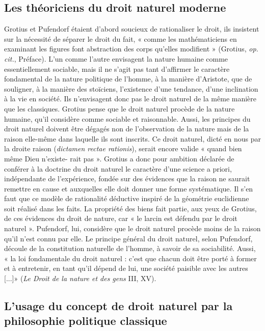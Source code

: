 \subsection{Les théoriciens du droit naturel moderne}

Grotius et Pufendorf étaient d’abord
soucieux de rationaliser le droit, ils insistent sur la nécessité de séparer le droit
du fait, « comme les mathématiciens en
examinant les figures font abstraction
des corps qu'elles modifient » (Grotius,
{\it op. cit.}, Préface). L'un comme l’autre
envisagent la nature humaine comme
essentiellement sociable, mais il ne s’agit
pas tant d’affirmer le caractère fondamental de la nature politique de l’homme, à la
manière d’Aristote, que de souligner, à la
manière des stoïciens, l’existence d’une
tendance, d’une inclination à la vie en
société. Ils n’envisagent donc pas le droit
naturel de la même manière que les classiques. Grotius pense que le droit naturel
procède de la nature humaine, qu'il considère comme sociable et raisonnable.
Aussi, les principes du droit naturel doivent être dégagés non de l’observation de
la nature mais de la raison elle-même
dans laquelle ils sont inscrits. Ce droit
naturel, dicté en nous par la droite raison
({\it dictamen rectae rationis}), serait encore
valide « quand bien même Dieu n’existe-
rait pas ». Grotius a donc pour ambition
déclarée de conférer à la doctrine du droit
naturel le caractère d’une science a priori,
indépendante de l’expérience, fondée sur
des évidences que la raison ne saurait
remettre en cause et auxquelles elle doit
donner une forme systématique. Il s’en
faut que ce modèle de rationalité déductive inspiré de la géométrie euclidienne
soit réalisé dans les faits. La propriété des
biens fait partie, aux yeux de Grotius, de
ces évidences du droit de nature, car « le
larcin est défendu par le droit naturel ».
Pufendorf, lui, considère que le droit
naturel procède moins de la raison qu'il
n'est connu par elle. Le principe général
du droit naturel, selon Pufendorf, découle
de la constitution naturelle de l’homme,
à savoir de sa sociabilité. Aussi, « la loi
fondamentale du droit naturel : c’est que
chacun doit être porté à former et à entretenir, en tant qu'il dépend de lui, une
société paisible avec les autres [...]» ({\it Le
Droit de la nature et des gens} III, XV).

\subsection{L'usage du concept de droit naturel
par la philosophie politique classique}

